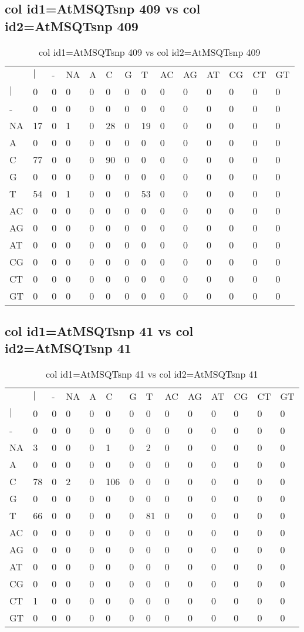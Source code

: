 \subsection{col id1=AtMSQTsnp 409 vs col id2=AtMSQTsnp 409}
\begin{center}
\begin{longtable}{|l|l|l|l|l|l|l|l|l|l|l|l|l|l|}
\caption{col id1=AtMSQTsnp 409 vs col id2=AtMSQTsnp 409} \label{table_dm920}\\
\hline
\\
\hline
&$|$&-&NA&A&C&G&T&AC&AG&AT&CG&CT&GT\\
$|$&0&0&0&0&0&0&0&0&0&0&0&0&0\\
-&0&0&0&0&0&0&0&0&0&0&0&0&0\\
NA&17&0&1&0&28&0&19&0&0&0&0&0&0\\
A&0&0&0&0&0&0&0&0&0&0&0&0&0\\
C&77&0&0&0&90&0&0&0&0&0&0&0&0\\
G&0&0&0&0&0&0&0&0&0&0&0&0&0\\
T&54&0&1&0&0&0&53&0&0&0&0&0&0\\
AC&0&0&0&0&0&0&0&0&0&0&0&0&0\\
AG&0&0&0&0&0&0&0&0&0&0&0&0&0\\
AT&0&0&0&0&0&0&0&0&0&0&0&0&0\\
CG&0&0&0&0&0&0&0&0&0&0&0&0&0\\
CT&0&0&0&0&0&0&0&0&0&0&0&0&0\\
GT&0&0&0&0&0&0&0&0&0&0&0&0&0\\
\hline
\end{longtable}
\end{center}

\subsection{col id1=AtMSQTsnp 41 vs col id2=AtMSQTsnp 41}
\begin{center}
\begin{longtable}{|l|l|l|l|l|l|l|l|l|l|l|l|l|l|}
\caption{col id1=AtMSQTsnp 41 vs col id2=AtMSQTsnp 41} \label{table_dm922}\\
\hline
\\
\hline
&$|$&-&NA&A&C&G&T&AC&AG&AT&CG&CT&GT\\
$|$&0&0&0&0&0&0&0&0&0&0&0&0&0\\
-&0&0&0&0&0&0&0&0&0&0&0&0&0\\
NA&3&0&0&0&1&0&2&0&0&0&0&0&0\\
A&0&0&0&0&0&0&0&0&0&0&0&0&0\\
C&78&0&2&0&106&0&0&0&0&0&0&0&0\\
G&0&0&0&0&0&0&0&0&0&0&0&0&0\\
T&66&0&0&0&0&0&81&0&0&0&0&0&0\\
AC&0&0&0&0&0&0&0&0&0&0&0&0&0\\
AG&0&0&0&0&0&0&0&0&0&0&0&0&0\\
AT&0&0&0&0&0&0&0&0&0&0&0&0&0\\
CG&0&0&0&0&0&0&0&0&0&0&0&0&0\\
CT&1&0&0&0&0&0&0&0&0&0&0&0&0\\
GT&0&0&0&0&0&0&0&0&0&0&0&0&0\\
\hline
\end{longtable}
\end{center}

